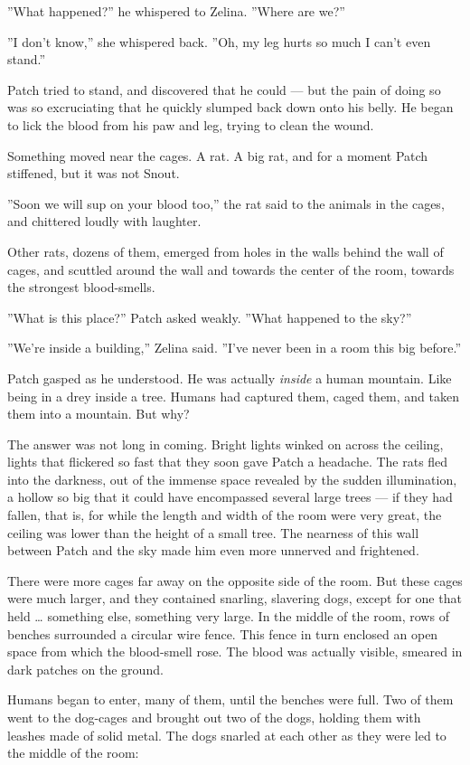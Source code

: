 \documentclass[12pt]{book}
\begin{document}
''What happened?'' he whispered to Zelina. ''Where are we?''

''I don't know,'' she whispered back. ''Oh, my leg hurts so much I can't even stand.''

Patch tried to stand, and discovered that he could ---
but the pain of doing so was so excruciating that he quickly slumped back down onto his belly. He began to lick the blood from his paw and leg, trying to clean the wound.

Something moved near the cages. A rat. A big rat, and for a moment Patch stiffened, but it was not Snout.

''Soon we will sup on your blood too,'' the rat said to the animals in the cages, and chittered loudly with laughter.

Other rats, dozens of them, emerged from holes in the walls behind the wall of cages, and scuttled around the wall and towards the center of the room, towards the strongest blood-smells.

''What is this place?'' Patch asked weakly. ''What happened to the sky?''

''We're inside a building,'' Zelina said. ''I've never been in a room this big before.''

Patch gasped as he understood. He was actually {\it inside} a human mountain. Like being in a drey inside a tree. Humans had captured them, caged them, and taken them into a mountain. But why?

The answer was not long in coming. Bright lights winked on across the ceiling, lights that flickered so fast that they soon gave Patch a headache. The rats fled into the darkness, out of the immense space revealed by the sudden illumination, a hollow so big that it could have encompassed several large trees ---
if they had fallen, that is, for while the length and width of the room were very great, the ceiling was lower than the height of a small tree. The nearness of this wall between Patch and the sky made him even more unnerved and frightened.

There were more cages far away on the opposite side of the room. But these cages were much larger, and they contained snarling, slavering dogs, except for one that held \ldots{}
something else, something very large. In the middle of the room, rows of benches surrounded a circular wire fence. This fence in turn enclosed an open space from which the blood-smell rose. The blood was actually visible, smeared in dark patches on the ground.

Humans began to enter, many of them, until the benches were full. Two of them went to the dog-cages and brought out two of the dogs, holding them with leashes made of solid metal. The dogs snarled at each other as they were led to the middle of the room:
\end{document}
